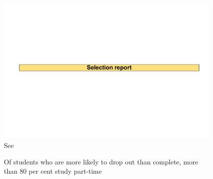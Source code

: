                 \begin{figure}
                    \caption{Of students who are more likely to drop out than complete, more than 80 per cent study part-time\label{fig:22}}%
                    \includegraphics[page=28]{atlas/selection_chartdeck.pdf} 
                    {See }
                \end{figure}


